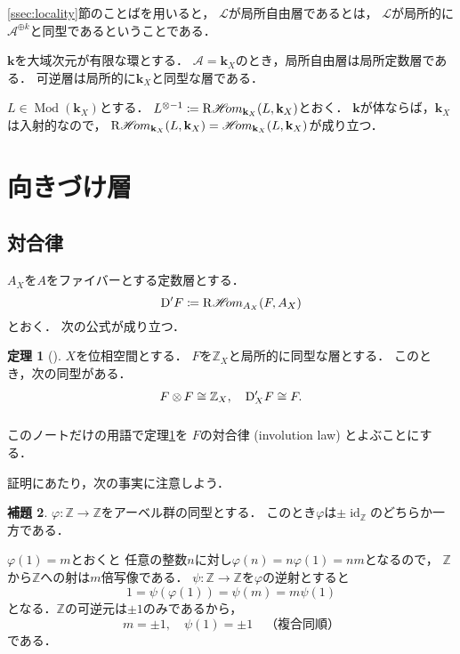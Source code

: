 \documentclass[uplatex,dvipdfmx,a4paper,10pt]{jsarticle}
\makeatletter
\theoremstyle{definition}
\newcommand{\ZZ}{\mathbb{Z}}
\newcommand{\bk}{\mathbf{k}}
\newcommand{\mcal}{\mathcal}
\newcommand{\Mod}{\mathop{\mathrm{Mod}}\nolimits}
\renewenvironment{proof}[1][\proofname]{\par
  \pushQED{\qed}%
  \normalfont \topsep6\p@\@plus6\p@\relax
  \trivlist
  \item[\hskip\labelsep
         \bfseries
    {#1}]\ignorespaces
}{%
  \popQED\endtrivlist\@endpefalse
}
\renewcommand{\proofname}{証明.}
\numberwithin{equation}{section}
\newcommand{\id}{\mathop{\mathrm{id}}\nolimits}
\newcommand{\cA}{\mcal{A}}
\newcommand{\cL}{\mcal{L}}
\newcommand{\HOM}{\mathop{\mathscr{H}\hspace{-2pt}om}\nolimits}%
\newcommand{\RHOM}{\mathop{\mathrm{R}\hspace{-1.5pt}\HOM}\nolimits}
\newcommand{\rmD}{\mathrm{D}}
\newcommand{\tens}[1][]{\mathbin{\otimes_{\raise1.5ex\hbox to-.1em{}{#1}}}}
\newcommand{\ttens}[1][]{\mathbin{\mathop{\overset{\mathrm{}}{\tens}}_{#1}}}
\theoremstyle{mystyle}
\newtheorem{mythm}{定理}[section]
\newtheorem{mylmm}[mythm]{補題}
\newenvironment{thm}{\begin{thmbox}\begin{mythm}}{\end{mythm}\end{thmbox}}
\newenvironment{lmm}{\begin{lmmbox}\begin{mylmm}}{\end{mylmm}\end{lmmbox}}
\makeatother
\begin{document}
\ref{ssec:locality}節のことばを用いると，
\(\cL\)が局所自由層であるとは，
\(\cL\)が局所的に\(\cA^{\oplus k}\)と同型であるということである．

\(\bk\)を大域次元が有限な環とする．
\(\cA=\bk_X\)のとき，局所自由層は局所定数層である．
可逆層は局所的に\(\bk_X\)と同型な層である．

\(L\in\Mod(\bk_X)\)とする．
\(L^{\otimes -1}\coloneqq\RHOM_{\bk_X}(L,\bk_X)\)とおく．
\(\bk\)が体ならば，\(\bk_X\)は入射的なので，
\(\RHOM_{\bk_X}(L,\bk_X)=\HOM_{\bk_X}(L,\bk_X)\)が成り立つ．

\section{向きづけ層}

\subsection{対合律}

\(A_X\)を\(A\)をファイバーとする定数層とする．
\[
    \rmD'F\coloneqq \RHOM_{A_X}(F,A_X)
\]
とおく．
次の公式が成り立つ．

\begin{thm}[{\cite[演習III.3]{KS90}}]\label{thm:ori-dual}
    \(X\)を位相空間とする．
    \(F\)を\(\ZZ_X\)と局所的に同型な層とする．
    このとき，次の同型がある．\[
        F\ttens[]F\cong \ZZ_X,
        \quad
        \rmD'_{X} F\cong F.
    \]
\end{thm}
このノートだけの用語で定理\ref{thm:ori-dual}を
\(F\)の対合律 (involution law) とよぶことにする．

証明にあたり，次の事実に注意しよう．
\begin{lmm}\label{lmm:pm1}
    \(\varphi\colon\ZZ\to\ZZ\)をアーベル群の同型とする．
    このとき\(\varphi\)は\(\pm\id_{\ZZ}\)のどちらか一方である．
\end{lmm}

\begin{proof}
    \(\varphi(1)=m\)とおくと
    任意の整数\(n\)に対し\(\varphi(n)=n\varphi(1)=nm\)となるので，
    \(\ZZ\)から\(\ZZ\)への射は\(m\)倍写像である．
    \(\psi\colon\ZZ\to\ZZ\)を\(\varphi\)の逆射とすると
    \[
        1=\psi(\varphi(1))=\psi(m)=m\psi(1)
    \]
    となる．\(\ZZ\)の可逆元は\(\pm1\)のみであるから，
    \[
        m=\pm1,
        \quad
        \psi(1)=\pm1
        \quad
        \text{（複合同順）}
    \]
    である．
\end{proof}
\end{document}
